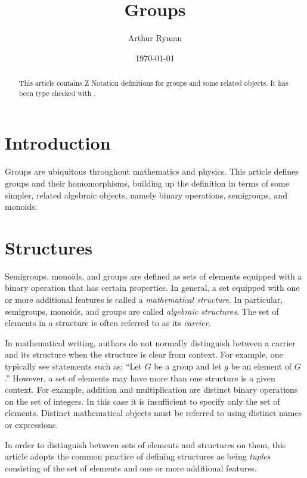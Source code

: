\documentclass{amsart}
\begin{document}
\title{Groups}
\author{Arthur Ryman}
\date{\today}

\begin{abstract}
This article contains Z Notation definitions for groups and some related objects.
It has been type checked with \fuzz.
\end{abstract}

\maketitle

\tableofcontents

\section{Introduction}

Groups are ubiquitous throughout mathematics and physics.
This article defines groups and their homomorphisms,
building up the definition in terms of some simpler, related algebraic objects,
namely binary operations, semigroups, and monoids.

\section{Structures}

Semigroups, monoids, and groups are defined as sets of elements equipped with a binary operation that has certain properties.
In general, a set equipped with one or more additional features is called a \textit{mathematical structure}.
In particular, semigroups, monoids, and groups are called \textit{algebraic structures}. 
The set of elements in a structure is often referred to as its \textit{carrier}.

In mathematical writing, authors do not normally distinguish between a carrier and its structure
when the structure is clear from context.
For example, one typically see statements such as:  
``Let $G$ be a group and let $g$ be an element of $G$.''
However, a set of elements may have more than one structure is a given context.
For example, addition and multiplication are distinct binary operations on the set of integers.
In this case it is insufficient to specify only the set of elements.
Distinct mathematical objects
must be referred to using distinct names or expressions.

In order to distinguish between sets of elements and structures on them, 
this article adopts the common practice of defining structures as being \textit{tuples}
consisting of the set of elements and one or more additional features.
\end{document}
